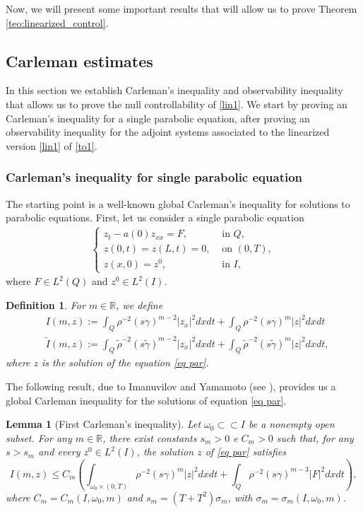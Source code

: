 \documentclass[11pt,a4paper]{amsart}
\numberwithin{equation}{section}
\newtheorem{definition}{Definition}[section]
\newtheorem{lemma}{Lemma}[section]
\begin{document}
Now, we will present some important results that will allow us to prove Theorem \ref{teo:linearized_control}.

\subsection{Carleman estimates}
In this section we establish Carleman's inequality and observability inequality that allows us to prove the null controllability of \eqref{lin1}. We start by proving an Carleman's inequality for a single parabolic equation, after proving an observability inequality for the adjoint systems associated to the linearized version \eqref{lin1} of \eqref{to1}.

\subsubsection{Carleman's inequality for single parabolic equation}
The starting point is a well-known global Carleman's inequality for solutions to parabolic equations. First, let us consider a single parabolic equation
\begin{align} \label{eq par}
		\begin{cases}
			z_{t}-a(0)z_{xx}= F, &\text{ in } Q,\\
   			z(0,t) = z(L,t) =0,  &\text{ on } (0,T),\\
			z(x,0) = z^0, &\text{ in } I,
		\end{cases}		
	\end{align}where $F\in L^2(Q)$ and $z^0\in L^2(I)$.

\begin{definition}
	For $m \in \mathbb{R}$, we define
        \begin{align*}
           	    	&I(m,z) := \int_Q \rho^{-2}(s\gamma)^{m-2}|z_x|^2dxdt +\int_Q \rho^{-2}(s\gamma)^{m}|z|^2dxdt\\
	    		&\tilde{I}(m,z) := \int_Q \tilde{\rho}^{-2}(s\tilde{\gamma})^{m-2}|z_x|^2dxdt +\int_Q \tilde{\rho}^{-2}(s\tilde{\gamma})^{m}|z|^2dxdt,   
	\end{align*}where $z$ is the solution of the equation \eqref{eq par}.
\end{definition}The following result, due to Imanuvilov and Yamamoto (see \cite{Imanu-Yama}), provides us a global Carleman inequality for the solutions of equation \eqref{eq par}.

\begin{lemma}[First Carleman's inequality]\label{lema carleman 1}
Let $\omega_0\subset\subset I$ be a nonempty open subset. For any $m\in \mathbb{R}$, there exist constants $s_m>0$ e $C_m>0$ such that, for any $s>s_m$ and every $z^0 \in L^2(I)$, the
solution $z$ of \eqref{eq par} satisfies
    \begin{equation} \label{carleman1}
        I(m,z)\leq C_m\left( \int_{\omega_0 \times (0,T)} \rho^{-2}(s\gamma)^m\vert z \vert^2 dxdt +\int_Q \rho^{-2}(s\gamma)^{m-3}\vert F\vert^2dxdt \right),
    \end{equation}  where $C_m = C_m(I,\omega_0,m)$ and $s_m=(T+T^2)\sigma_m$, with $\sigma_m = \sigma_m(I,\omega_0,m)$.
\end{lemma}
\end{document}
